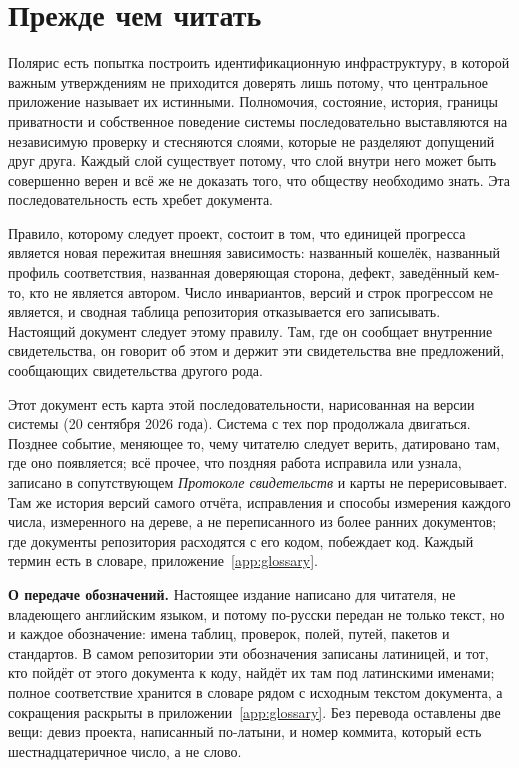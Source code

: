 \section*{Прежде чем читать}

Полярис есть попытка построить идентификационную инфраструктуру, в которой важным утверждениям
не приходится доверять лишь потому, что центральное приложение называет их истинными.
Полномочия, состояние, история, границы приватности и собственное поведение системы
последовательно выставляются на независимую проверку и стесняются слоями, которые не разделяют
допущений друг друга. Каждый слой существует потому, что слой внутри него может быть совершенно
верен и всё же не доказать того, что обществу необходимо знать. Эта последовательность есть
хребет документа.

Правило, которому следует проект, состоит в том, что
единицей прогресса является новая пережитая внешняя зависимость: названный кошелёк, названный
профиль соответствия, названная доверяющая сторона, дефект, заведённый кем-то, кто не является
автором. Число инвариантов, версий и строк прогрессом не является, и сводная таблица репозитория
отказывается его записывать. Настоящий документ следует этому правилу. Там, где он сообщает
внутренние свидетельства, он говорит об этом и держит эти свидетельства вне предложений,
сообщающих свидетельства другого рода.

Этот документ есть карта этой последовательности, нарисованная на версии  системы
(20 сентября 2026 года). Система с тех пор продолжала двигаться. Позднее событие, меняющее то, чему
читателю следует верить, датировано там, где оно появляется; всё прочее, что поздняя работа
исправила или узнала, записано в сопутствующем \emph{Протоколе свидетельств} и карты не перерисовывает. Там же
история версий самого отчёта, исправления и способы измерения каждого числа, измеренного на дереве,
а не переписанного из более ранних документов; где документы репозитория расходятся с его кодом,
побеждает код. Каждый термин есть в словаре, приложение~\ref{app:glossary}.

\textbf{О передаче обозначений.} Настоящее издание написано для читателя, не владеющего английским языком, и потому по-русски передан не только текст, но и каждое обозначение: имена таблиц, проверок, полей, путей, пакетов и стандартов. В самом репозитории эти обозначения записаны латиницей, и тот, кто пойдёт от этого документа к коду, найдёт их там под латинскими именами; полное соответствие хранится в словаре рядом с исходным текстом документа, а сокращения раскрыты в приложении~\ref{app:glossary}. Без перевода оставлены две вещи: девиз проекта, написанный по-латыни, и номер коммита, который есть шестнадцатеричное число, а не слово.

